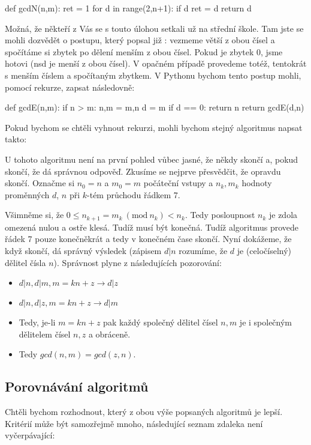 \begin{python}
def gcdN(n,m):
    ret = 1
    for d in range(2,n+1):
        if d %
            ret = d
    return d
\end{python}

Možná, že někteří z Vás se s touto úlohou setkali už na střední škole. Tam jste se mohli dozvědět o postupu, který 
popsal již : vezmeme větší z obou čísel a spočítáme si zbytek po dělení menším z obou čísel. Pokud je
zbytek 0, jsme hotovi (nsd je menší z obou čísel). V opačném případě provedeme totéž, tentokrát s menším číslem 
a spočítaným zbytkem. V Pythonu bychom tento postup mohli, pomocí rekurze, zapsat následovně:

\begin{python}
def gcdE(n,m):
    if n > m:
        n,m = m,n
    d = m %
    if d == 0:
        return n
    return gcdE(d,n)
\end{python}

Pokud bychom se chtěli vyhnout rekurzi, mohli bychom stejný algoritmus napsat takto:


U tohoto algoritmu není na první pohled vůbec jasné, že někdy skončí a, pokud skončí, že dá správnou odpověď.
Zkusíme se nejprve přesvědčit, že opravdu skončí. Označme si $n_0 = n$ a $m_0=m$ počáteční vstupy a $n_k, m_k$ hodnoty proměnných 
$d$, $n$ při $k$-tém průchodu řádkem 7. 

Všimněme si, že $0\leq n_{k+1} = m_k\ (\mbox{mod}\ n_k) <n_k$. Tedy posloupnost $n_k$ je zdola omezená
nulou a ostře klesá. Tudíž musí být konečná. Tudíž algoritmus provede řádek 7 pouze konečněkrát a tedy v konečném
čase skončí. Nyní dokážeme, že když skončí, dá správný výsledek (zápisem $d|n$ rozumíme, že $d$ je (celočíselný) dělitel čísla $n$). Správnost
plyne z následujících pozorování:

\begin{itemize}
 \item $d|n, d|m, m = kn + z \rightarrow d|z$
 \item $d|n, d|z, m = kn + z \rightarrow d|m$
 \item Tedy, je-li $m = kn + z$ pak každý společný dělitel čísel $n,m$ je i společným dělitelem čísel $n,z$ a obráceně.
 \item Tedy $gcd(n,m) = gcd(z,n)$.
\end{itemize}

\subsection{Porovnávání algoritmů} 
Chtěli bychom rozhodnout, který z obou výše popsaných algoritmů je lepší. Kritérií může být samozřejmě mnoho,
následující seznam zdaleka není vyčerpávající:

